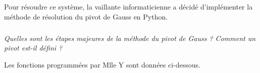 \documentclass[10pt]{article}
\newif\ifprof
\begin{document}
\ifprof
\begin{corrige}
On isole 3, qui est soumis à 3 actions mécaniques et applique le PFS en B : 
 $$
 \left\{
 \begin{array}{l}
  F_z + Z_B = 0 \\
 F_y + Y_B + Y_C = 0 \\
R  F_z  - l F_y + L Y_C = 0 
 \end{array}
 \right.
 \Longleftrightarrow
 \left\{
 \begin{array}{l}
 Z_B = -F_z \\
  Y_B + Y_C = -F_y \\
  L Y_C = - R  F_z  - l F_y 
 \end{array}
 \right.
 \Longleftrightarrow 
 \left(
 \begin{array}{ccc}
 0 & 1 & 0 \\
 1 & 0 & 1 \\
 0 & 0 & 1
 \end{array}
 \right)
 \left(
 \begin{array}{c}
 Y_B \\ Z_B \\ Y_C \\ 
 \end{array}
 \right)
 = 
 \left(
 \begin{array}{c}
 -F_z \\
 -F_y \\
 - R  F_z  - l F_y 
 \end{array}
 \right)
 $$

\end{corrige}
\else

\fi

	
Pour résoudre ce système, la vaillante informaticienne a décidé d'implémenter la méthode de résolution du pivot de Gauss en Python.

\subparagraph{}
\textit{Quelles sont les étapes majeures de la méthode du pivot de Gauss ? Comment un pivot est-il défini ?}

Les fonctions programmées par Mlle Y sont données ci-dessous.
\end{document}
